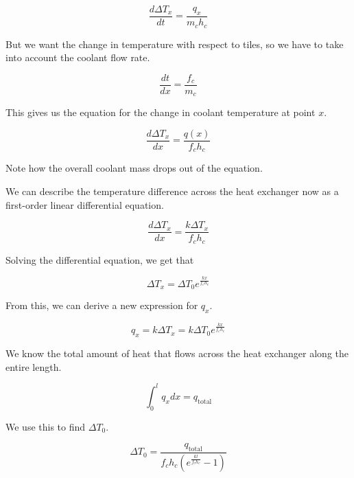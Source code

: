 \documentclass{article}
\numberwithin{equation}{subsection}
\theoremstyle{remark}
\newcommand{\qtotal}{q_{\mathrm{total}}}
\newcommand{\DeltaT}{\Delta{}T}
\begin{document}
\begin{equation}
\frac{d\DeltaT_{x}}{dt} = \frac{q_{x}}{m_{c} h_{c}}
\end{equation}

But we want the change in temperature with respect to tiles, so we have to take into account the coolant flow rate.

\begin{equation}
\frac{dt}{dx} = \frac{f_{c}}{m_{c}}
\end{equation}

This gives us the equation for the change in coolant temperature at point \(x\).

\begin{equation}
\frac{d\DeltaT_{x}}{d x} = \frac{q \left(x\right)}{f_{c} h_{c}}
\end{equation}

Note how the overall coolant mass drops out of the equation.

We can describe the temperature difference across the heat exchanger now as a first-order linear differential equation.

\begin{equation}
\frac{d\DeltaT_{x}}{dx} = \frac{k \DeltaT_{x}}{f_{c} h_{c}}
\end{equation}

Solving the differential equation, we get that

\begin{equation}
\DeltaT_{x} = \DeltaT_{0} e^{\frac{k x}{f_{c} h_{c}}}
\end{equation}

From this, we can derive a new expression for \(q_{x}\).

\begin{equation}
q_{x} = k \DeltaT_{x} = k \DeltaT_{0} e^{\frac{k x}{f_{c} h_{c}}}
\end{equation}

We know the total amount of heat that flows across the heat exchanger along the entire length.

\begin{equation}
\int_{0}^{l} q_{x} dx = \qtotal
\end{equation}

We use this to find \(\DeltaT_{0}\).

\begin{equation}
\DeltaT_{0} = \frac{\qtotal}{f_{c} h_{c} \left(e^{\frac{k l}{f_{c} h_{c}}} - 1\right)}
\end{equation}
\end{document}
